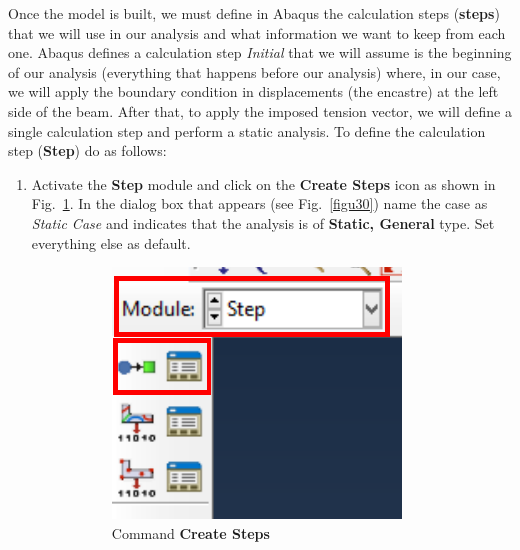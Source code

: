 Once the model is built, we must define in Abaqus the calculation
steps (\textbf{steps}) that we will use in our analysis and what
information we want to keep from each one. Abaqus defines a
calculation step \textit{Initial} that we will assume is the beginning
of our analysis (everything that happens before our analysis) where, in our case, we
will apply the boundary condition in displacements (the encastre) at
the left side of the beam. After that, to apply the imposed tension
vector, we will define a single calculation step and perform a static
analysis. To define the calculation step (\textbf {Step}) do as
follows:
\begin{enumerate}
\item Activate the \textbf{Step} module and click on the
  \textbf{Create Steps} icon as shown in Fig.~\ref{figu29}. In the
  dialog box that appears (see Fig.~\ref{figu30}) name the case as
  \textit{Static Case} and indicates that the analysis is of
  \textbf{Static, General} type. Set everything else as default.
  \begin{figure}[H]
    \centering
    \begin{subfigure}{0.29\textwidth}
      \includegraphics[width=\textwidth]{./body/images/imagen29.pdf}
      \caption{Command \textbf{Create Steps}}
      \label{figu29}
    \end{subfigure}%
    ~ %
    \begin{subfigure}{0.40\textwidth}

\end{subfigure}
\end{figure}
\end{enumerate}
